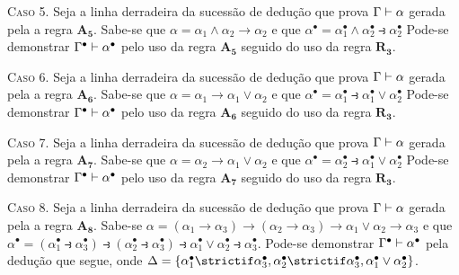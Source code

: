 \begin{tcolorbox}[enhanced jigsaw, breakable, sharp corners, colframe=black, colback=white, boxrule=0.5pt, left=1.5mm, right=1.5mm, top=1.5mm, bottom=1.5mm]
        \vspace{.5\baselineskip}
        \textsc{Caso 5.}
        Seja a linha derradeira da sucessão de dedução que prova $\Gamma\mathrel{\vdash}\alpha$ gerada pela a regra $\hyperref[intuitionistic.axiom.5]{\mathbf{A_5}}$.
        Sabe-se que $\alpha=\alpha_1\wedge\alpha_2\to\alpha_2$ e que $\alpha^\bullet=\alpha_1^\bullet\wedge\alpha_2^\bullet\strictif\alpha_2^\bullet$
        Pode-se demonstrar $\Gamma^\bullet\mathrel{\vdash}\alpha^\bullet$ pelo uso da regra $\hyperref[modal.axiom.5]{\mathbf{A_5}}$ seguido do uso da regra $\hyperref[modal.rule.3]{\mathbf{R_3}}$.

        \vspace{.5\baselineskip}
        \textsc{Caso 6.}
        Seja a linha derradeira da sucessão de dedução que prova $\Gamma\mathrel{\vdash}\alpha$ gerada pela a regra $\hyperref[intuitionistic.axiom.6]{\mathbf{A_6}}$.
        Sabe-se que $\alpha=\alpha_1\to\alpha_1\vee\alpha_2$ e que $\alpha^\bullet=\alpha_1^\bullet\strictif\alpha_1^\bullet\vee\alpha_2^\bullet$
        Pode-se demonstrar $\Gamma^\bullet\mathrel{\vdash}\alpha^\bullet$ pelo uso da regra $\hyperref[modal.axiom.6]{\mathbf{A_6}}$ seguido do uso da regra $\hyperref[modal.rule.3]{\mathbf{R_3}}$.

        \vspace{.5\baselineskip}
        \textsc{Caso 7.}
        Seja a linha derradeira da sucessão de dedução que prova $\Gamma\mathrel{\vdash}\alpha$ gerada pela a regra $\hyperref[intuitionistic.axiom.7]{\mathbf{A_7}}$.
        Sabe-se que $\alpha=\alpha_2\to\alpha_1\vee\alpha_2$ e que $\alpha^\bullet=\alpha_2^\bullet\strictif\alpha_1^\bullet\vee\alpha_2^\bullet$
        Pode-se demonstrar $\Gamma^\bullet\mathrel{\vdash}\alpha^\bullet$ pelo uso da regra $\hyperref[modal.axiom.7]{\mathbf{A_7}}$ seguido do uso da regra $\hyperref[modal.rule.3]{\mathbf{R_3}}$.

        \vspace{.5\baselineskip}
        \textsc{Caso 8.}
        Seja a linha derradeira da sucessão de dedução que prova $\Gamma\mathrel{\vdash}\alpha$ gerada pela a regra $\hyperref[intuitionistic.axiom.8]{\mathbf{A_8}}$.
        Sabe-se $\alpha=(\alpha_1\to\alpha_3)\to(\alpha_2\to\alpha_3)\to\alpha_1\vee\alpha_2\to\alpha_3$ e que $\alpha^\bullet=(\alpha_1^\bullet\strictif\alpha_3^\bullet)\strictif(\alpha_2^\bullet\strictif\alpha_3^\bullet)\strictif\alpha_1^\bullet\vee\alpha_2^\bullet\strictif\alpha_3^\bullet$.
        Pode-se demonstrar $\Gamma^\bullet\mathrel{\vdash}\alpha^\bullet$ pela dedução que segue, onde $\Delta=\set{\alpha_1^\bullet\strictif\alpha_3^\bullet,\alpha_2^\bullet\strictif\alpha_3^\bullet,\alpha_1^\bullet\vee\alpha_2^\bullet}$.


\end{tcolorbox}
